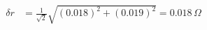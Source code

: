 

\begin{align*}
    \delta r &= \frac{1}{\sqrt{2}}\sqrt{\left(0.018\right)^2+\left(0.019\right)^2}= 0.018\,\Omega
\end{align*}